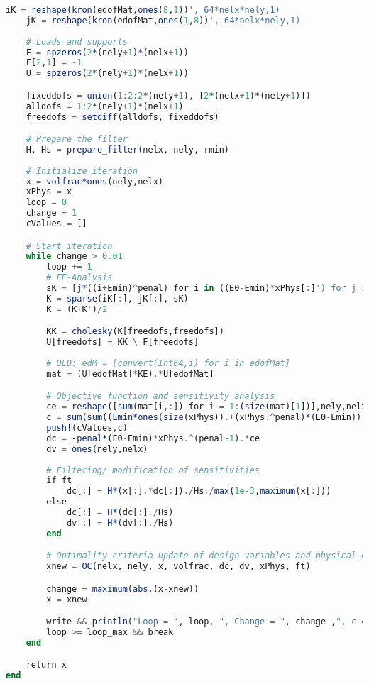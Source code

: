 \begin{lstlisting}[language=Julia, title=\texttt{top88.jl}]
    iK = reshape(kron(edofMat,ones(8,1))', 64*nelx*nely,1)
    jK = reshape(kron(edofMat,ones(1,8))', 64*nelx*nely,1)
    
    # Loads and supports
    F = spzeros(2*(nely+1)*(nelx+1))
    F[2,1] = -1
    U = spzeros(2*(nely+1)*(nelx+1))

    fixeddofs = union(1:2:2*(nely+1), [2*(nelx+1)*(nely+1)])
    alldofs = 1:2*(nely+1)*(nelx+1)
    freedofs = setdiff(alldofs, fixeddofs)

    # Prepare the filter
    H, Hs = prepare_filter(nelx, nely, rmin)
    
    # Initialize iteration
    x = volfrac*ones(nely,nelx)
    xPhys = x
    loop = 0
    change = 1
    cValues = []

    # Start iteration
    while change > 0.01
        loop += 1
        # FE-Analysis
        sK = [j*((i+Emin)^penal) for i in ((E0-Emin)*xPhys[:]') for j in KE[:]]
        K = sparse(iK[:], jK[:], sK)
        K = (K+K')/2

        KK = cholesky(K[freedofs,freedofs])
        U[freedofs] = KK \ F[freedofs]
        
        # OLD: edM = [convert(Int64,i) for i in edofMat]
        mat = (U[edofMat]*KE).*U[edofMat]

        # Objective function and sensitivity analysis
        ce = reshape([sum(mat[i,:]) for i = 1:(size(mat)[1])],nely,nelx)
        c = sum(sum((Emin*ones(size(xPhys)).+(xPhys.^penal)*(E0-Emin)).*ce))
        push!(cValues,c)
        dc = -penal*(E0-Emin)*xPhys.^(penal-1).*ce
        dv = ones(nely,nelx)
        
        # Filtering/ modification of sensitivities
        if ft
            dc[:] = H*(x[:].*dc[:])./Hs./max(1e-3,maximum(x[:]))
        else
            dc[:] = H*(dc[:]./Hs)
            dv[:] = H*(dv[:]./Hs)
        end

        # Optimality criteria update of design variables and physical densities
        xnew = OC(nelx, nely, x, volfrac, dc, dv, xPhys, ft)

        change = maximum(abs.(x-xnew))
        x = xnew

        write && println("Loop = ", loop, ", Change = ", change ,", c = ", c, ", structural density = ", mean(x))
        loop >= loop_max && break       
    end

    return x
end



\end{lstlisting}
